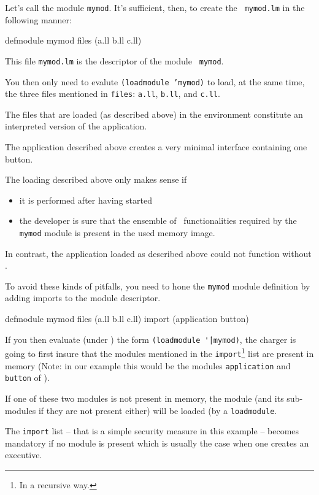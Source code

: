 Let's call the module {\tt mymod}. It's sufficient, then, to create the {\tt
mymod.lm} in the following manner:

\begin{Code*}
defmodule mymod
files (a.ll b.ll c.ll)
\end{Code*}

This file {\tt mymod.lm} is the descriptor of the module {\tt
mymod}.

You then only need to evalute {\tt (loadmodule 'mymod)} to load, at the same time, the three files mentioned in {\tt files}:  {\tt a.ll}, {\tt b.ll}, and {\tt c.ll}.

The files that are loaded (as described above) in the environment constitute an interpreted version of the application. 


The application described above creates a very minimal interface containing one \Aida button.

The loading described above only makes sense if 

\begin{itemize}
\item it is performed after having started \Aida\
\item the developer is sure that the ensemble of \Aida\ functionalities required by the {\tt mymod} module is present in the used memory image.
\end{itemize}

In contrast, the application loaded as described above could not function without \Aida.

To avoid these kinds of pitfalls, you need to hone the {\tt mymod} module definition by adding imports to the module descriptor. 

\begin{Code*}
defmodule mymod
files (a.ll b.ll c.ll)
import (application button)
\end{Code*}

If you then evaluate (under \Aida) the form {\tt (loadmodule \|'|mymod)}, 
the charger is going to first insure that the modules mentioned in the
{\tt import}\footnote{In a recursive way.}
list are present in memory 
(Note:  in our example this would be the modules {\tt application}
 and {\tt button} of \Aida). 

If one of these two modules is not present in memory, the module (and its sub-modules if they are not present either) will be loaded (by a {\tt loadmodule}.

The {\tt import} list -- that is a simple security measure in this example -- becomes mandatory if no module is present which is usually the case when one creates an executive.

